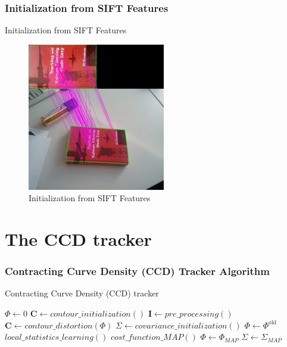 \documentclass[english,10pt,presentation]{beamer}
\begin{document}
\begin{frame}
\frametitle{Initialization from SIFT Features}
\label{sec-4_4}
\begin{block}{Initialization from SIFT Features}
\label{sec-4_4_1}

    \begin{figure}[htb]
    \centering
    \includegraphics[width=6cm,angle=0]{./sift.jpg}
    \caption{\label{fig:sift}Initialization from SIFT Features}
    \end{figure}
\end{block}
\end{frame}
\section{The CCD tracker}
\label{sec-5}
\begin{frame}
\frametitle{Contracting Curve Density (CCD) Tracker Algorithm}
\label{sec-5_1}

  \begin{algorithm}[H]
    \caption{Contracting Curve Density (CCD) tracker}
    \begin{algorithmic}[1]
      \STATE $\Phi \gets 0$
      \STATE $\mathbf{C} \gets contour\_initialization()$
        \STATE $ \mathbf{I} \gets pre\_processing()$
        \STATE $ \mathbf{C} \gets contour\_distortion(\Phi)$
        \STATE $\Sigma \gets covariance\_initialization()$
        \STATE $\Phi \gets \Phi^{\mathrm{old}}$
          \STATE $local\_statistics\_learning() $
          \STATE $cost\_function\_MAP() $
        \ENDWHILE
        \STATE $\Phi \gets \Phi_{MAP}$
        \STATE $\Sigma \gets \Sigma_{MAP}$
      \ENDWHILE
    \end{algorithmic}
  \end{algorithm}
\end{frame}
\end{document}
